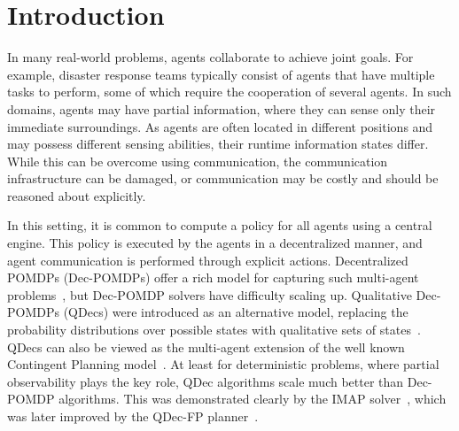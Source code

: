 \documentclass[letterpaper]{article} %
\theoremstyle{definition}
\begin{document}
\section{Introduction}

In many real-world problems, agents collaborate to achieve joint goals. For example, disaster response teams typically consist of agents that have multiple tasks to perform, 
some of which require the cooperation of several agents. 
In such domains, agents may have partial information, where they can sense only their immediate surroundings. 
As agents are often located in different positions and may possess different sensing abilities, their runtime information states differ.  While this can be overcome using communication, the communication infrastructure can be damaged, or communication may be costly and should be reasoned about explicitly.

In this setting, it is common to compute a policy for all agents %
using a central engine.
This policy is executed by the agents in a decentralized manner, and agent communication is performed through explicit actions. Decentralized POMDPs (Dec-POMDPs) offer a rich model for capturing such multi-agent problems~\citep{Bernstein02,OliehoekA16}, but Dec-POMDP solvers have difficulty scaling up.  Qualitative Dec-POMDPs (QDecs) were introduced as an alternative model, replacing the 
probability distributions over possible states with qualitative sets of states~\citep{BrafmanSZ13}. 
QDecs can also be viewed as the multi-agent extension of the well known Contingent Planning model~\citep{hoffmann2005contingent}. 
At least for deterministic problems, where partial observability plays the key role, QDec algorithms scale much better than Dec-POMDP algorithms. 
This was demonstrated clearly by the IMAP solver~\citep{IMAP}, which was later improved 
by the QDec-FP planner~\citep{ShekharBS19}.
\end{document}
